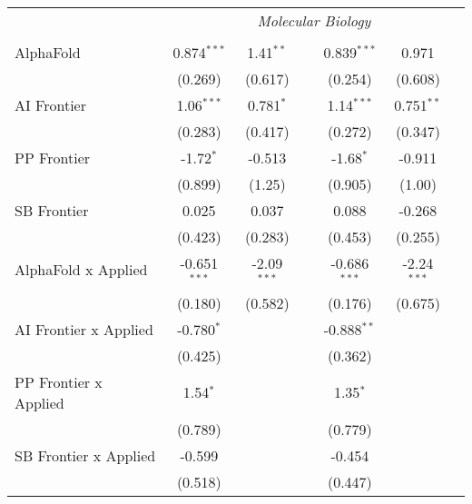 \begin{tabular}{lcccccc}
 & \multicolumn{6}{c}{\textit{Molecular Biology}} \\ \\
   AlphaFold                    & 0.874$^{***}$  & 1.41$^{**}$   &               & 0.839$^{***}$  & 0.971         &   \\   
                                & (0.269)        & (0.617)       &               & (0.254)        & (0.608)       &   \\   
   AI Frontier                  & 1.06$^{***}$   & 0.781$^{*}$   &               & 1.14$^{***}$   & 0.751$^{**}$  &   \\   
                                & (0.283)        & (0.417)       &               & (0.272)        & (0.347)       &   \\   
   PP Frontier                  & -1.72$^{*}$    & -0.513        &               & -1.68$^{*}$    & -0.911        &   \\   
                                & (0.899)        & (1.25)        &               & (0.905)        & (1.00)        &   \\   
   SB Frontier                  & 0.025          & 0.037         &               & 0.088          & -0.268        &   \\   
                                & (0.423)        & (0.283)       &               & (0.453)        & (0.255)       &   \\   
   AlphaFold x Applied          & -0.651$^{***}$ & -2.09$^{***}$ &               & -0.686$^{***}$ & -2.24$^{***}$ &   \\   
                                & (0.180)        & (0.582)       &               & (0.176)        & (0.675)       &   \\   
   AI Frontier x Applied        & -0.780$^{*}$   &               &               & -0.888$^{**}$  &               &   \\   
                                & (0.425)        &               &               & (0.362)        &               &   \\   
   PP Frontier x Applied        & 1.54$^{*}$     &               &               & 1.35$^{*}$     &               &   \\   
                                & (0.789)        &               &               & (0.779)        &               &   \\   
   SB Frontier x Applied        & -0.599         &               &               & -0.454         &               &   \\   
                                & (0.518)        &               &               & (0.447)        &               &   \\   

\end{tabular}
